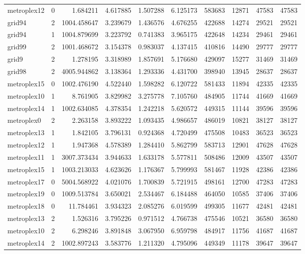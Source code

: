 \begin{longtable}{|l|r|r|r|r|r|r|r|r|r|}
metroplex12 & 0 & 1.684211 & 4.617885 & 1.507288 & 6.125173 & 583683 & 12871 & 47583 & 47583 \\
grid94 & 2 & 1004.458647 & 3.239679 & 1.436576 & 4.676255 & 422688 & 14274 & 29521 & 29521 \\
grid94 & 1 & 1004.879699 & 3.223792 & 0.741383 & 3.965175 & 422648 & 14234 & 29461 & 29461 \\
grid99 & 2 & 1001.468672 & 3.154378 & 0.983037 & 4.137415 & 410816 & 14490 & 29777 & 29777 \\
grid9 & 2 & 1.278195 & 3.318989 & 1.857691 & 5.176680 & 429097 & 15277 & 31469 & 31469 \\
grid98 & 2 & 4005.944862 & 3.138364 & 1.293336 & 4.431700 & 398940 & 13945 & 28637 & 28637 \\
metroplex15 & 0 & 1002.476190 & 4.522440 & 1.598282 & 6.120722 & 581433 & 11894 & 42335 & 42335 \\
metroplex10 & 1 & 8.761905 & 3.829982 & 3.275778 & 7.105760 & 484905 & 11744 & 41669 & 41669 \\
metroplex14 & 1 & 1002.634085 & 4.378354 & 1.242218 & 5.620572 & 449315 & 11144 & 39596 & 39596 \\
metroplex0 & 2 & 2.263158 & 3.893222 & 1.093435 & 4.986657 & 486019 & 10821 & 38127 & 38127 \\
metroplex13 & 1 & 1.842105 & 3.796131 & 0.924368 & 4.720499 & 475508 & 10483 & 36523 & 36523 \\
metroplex12 & 1 & 1.947368 & 4.578389 & 1.284410 & 5.862799 & 583713 & 12901 & 47628 & 47628 \\
metroplex11 & 1 & 3007.373434 & 3.944633 & 1.633178 & 5.577811 & 508486 & 12009 & 43507 & 43507 \\
metroplex15 & 1 & 1003.213033 & 4.623626 & 1.176367 & 5.799993 & 581467 & 11928 & 42386 & 42386 \\
metroplex17 & 0 & 5004.568922 & 4.021076 & 1.700839 & 5.721915 & 498161 & 12700 & 47283 & 47283 \\
metroplex19 & 0 & 1009.513784 & 3.650021 & 2.534467 & 6.184488 & 464050 & 10585 & 37406 & 37406 \\
metroplex18 & 0 & 11.784461 & 3.934323 & 2.085276 & 6.019599 & 499305 & 11677 & 42481 & 42481 \\
metroplex13 & 2 & 1.526316 & 3.795226 & 0.971512 & 4.766738 & 475546 & 10521 & 36580 & 36580 \\
metroplex10 & 2 & 6.298246 & 3.891848 & 3.067950 & 6.959798 & 484917 & 11756 & 41687 & 41687 \\
metroplex14 & 2 & 1002.897243 & 3.583776 & 1.211320 & 4.795096 & 449349 & 11178 & 39647 & 39647 \\

\end{longtable}
